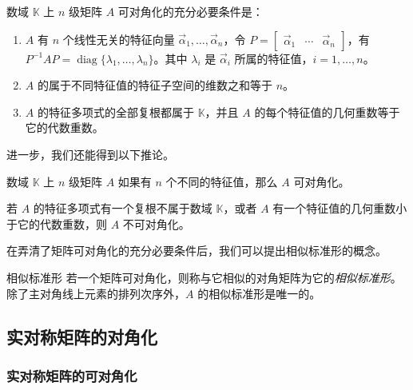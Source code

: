 \begin{theorem}[矩阵可对角化的充分必要条件]
	数域 $\mathbb K$ 上 $n$ 级矩阵 $A$ 可对角化的充分必要条件是：

	\begin{enumerate}
		\item $A$ 有 $n$ 个线性无关的特征向量 $\vec \alpha_1, \ldots, \vec \alpha_n$，令 $P = \begin{bmatrix} \vec \alpha_1 & \cdots & \vec \alpha_n \end{bmatrix}$，有 $P^{-1} A P = \operatorname{diag} \{\lambda_1, \ldots, \lambda_n\}$。其中 $\lambda_i$ 是 $\vec \alpha_i$ 所属的特征值，$i = 1, \ldots, n$。

		\item $A$ 的属于不同特征值的特征子空间的维数之和等于 $n$。

		\item $A$ 的特征多项式的全部复根都属于 $\mathbb K$，并且 $A$ 的每个特征值的几何重数等于它的代数重数。
	\end{enumerate}
\end{theorem}

进一步，我们还能得到以下推论。

\begin{theorem}
	数域 $\mathbb K$ 上 $n$ 级矩阵 $A$ 如果有 $n$ 个不同的特征值，那么 $A$ 可对角化。
\end{theorem}

\begin{theorem}
	若 $A$ 的特征多项式有一个复根不属于数域 $\mathbb K$，或者 $A$ 有一个特征值的几何重数小于它的代数重数，则 $A$ 不可对角化。
\end{theorem}

在弄清了矩阵可对角化的充分必要条件后，我们可以提出相似标准形的概念。

\begin{definition}{相似标准形}
	若一个矩阵可对角化，则称与它相似的对角矩阵为它的\emph{相似标准形}。除了主对角线上元素的排列次序外，$A$ 的相似标准形是唯一的。
\end{definition}

\subsection{实对称矩阵的对角化}

\subsubsection{实对称矩阵的可对角化}

